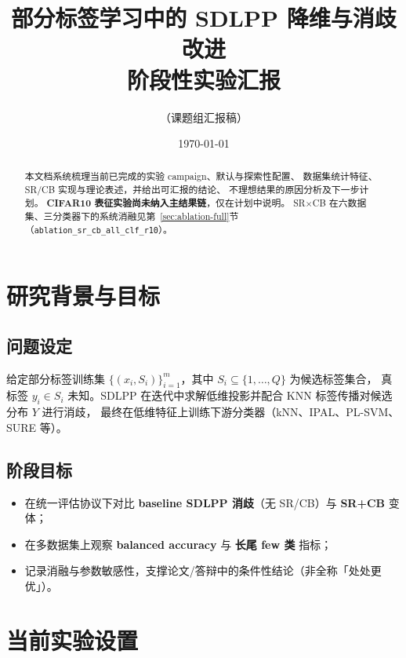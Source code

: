 \documentclass[11pt,a4paper]{article}
\title{\textbf{部分标签学习中的 SDLPP 降维与消歧改进\\阶段性实验汇报}}
\author{（课题组汇报稿）}
\date{\today}
\begin{document}
\maketitle

\begin{abstract}
本文档系统梳理当前已完成的实验 campaign、默认与探索性配置、
数据集统计特征、SR/CB 实现与理论表述，并给出可汇报的结论、
不理想结果的原因分析及下一步计划。
\textbf{CIFAR10 表征实验尚未纳入主结果链}，仅在计划中说明。
SR$\times$CB 在六数据集、三分类器下的系统消融见第~\ref{sec:ablation-full}节（\texttt{ablation\_sr\_cb\_all\_clf\_r10}）。
\end{abstract}

\tableofcontents
\newpage

\section{研究背景与目标}

\subsection{问题设定}
给定部分标签训练集 $\{(x_i, S_i)\}_{i=1}^m$，其中 $S_i \subseteq \{1,\ldots,Q\}$ 为候选标签集合，
真标签 $y_i \in S_i$ 未知。SDLPP 在迭代中求解低维投影并配合 KNN 标签传播对候选分布 $Y$ 进行消歧，
最终在低维特征上训练下游分类器（kNN、IPAL、PL-SVM、SURE 等）。

\subsection{阶段目标}
\begin{itemize}
  \item 在统一评估协议下对比 \textbf{baseline SDLPP 消歧}（无 SR/CB）与 \textbf{SR+CB} 变体；
  \item 在多数据集上观察 \textbf{balanced accuracy} 与 \textbf{长尾 few 类} 指标；
  \item 记录消融与参数敏感性，支撑论文/答辩中的条件性结论（非全称「处处更优」）。
\end{itemize}

\section{当前实验设置}
\end{document}

